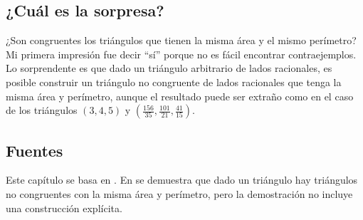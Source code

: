 \subsection*{¿Cuál es la sorpresa?}

¿Son congruentes los triángulos que tienen la misma área y el mismo perímetro? Mi primera impresión fue decir ``sí'' porque no es fácil encontrar contraejemplos. Lo sorprendente es que dado un triángulo arbitrario de lados racionales, es posible construir un triángulo no congruente de lados racionales que tenga la misma área y perímetro, aunque el resultado puede ser extraño como en el caso de los triángulos $(3,4,5)$ y $\left(\frac{156}{35}, \frac{101}{21}, \frac{41}{15}\right)$.

\subsection*{Fuentes}

Este capítulo se basa en \cite{mccallum}. En \cite{marita} se demuestra que dado un triángulo  hay triángulos no congruentes con la misma área y perímetro, pero la demostración no incluye una construcción explícita.
